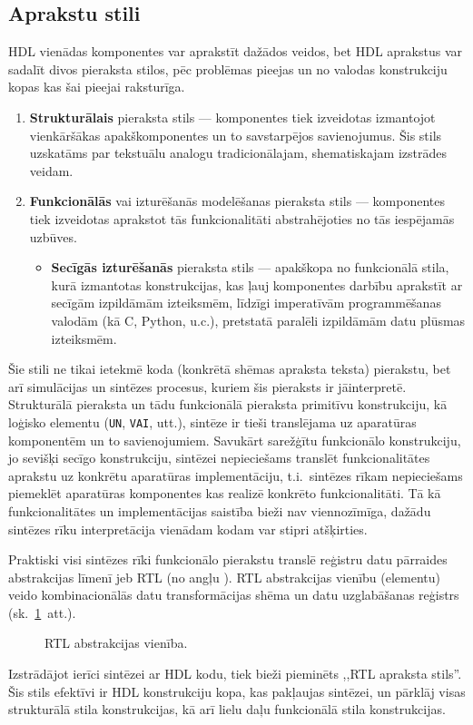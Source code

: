 \subsection{Aprakstu stili} \label{sec:hdl-styles}
HDL vienādas komponentes var aprakstīt dažādos veidos, bet
HDL aprakstus var sadalīt divos pieraksta stilos, pēc problēmas pieejas un
no valodas konstrukciju kopas kas šai pieejai raksturīga.
\begin{enumerate}
	\item \textbf{Strukturālais} pieraksta stils --- komponentes tiek
		izveidotas izmantojot vienkāršākas apakškomponentes un to savstarpējos
		savienojumus. Šis stils uzskatāms par tekstuālu analogu
		tradicionālajam, shematiskajam izstrādes veidam.
	\item \textbf{Funkcionālās} vai izturēšanās modelēšanas pieraksta
		stils --- komponentes tiek izveidotas aprakstot tās funkcionalitāti
		abstrahējoties no tās iespējamās uzbūves.
	\begin{itemize}
		\item \textbf{Secīgās izturēšanās} pieraksta stils --- apakškopa
			no funkcionālā stila, kurā izmantotas konstrukcijas, kas ļauj
			komponentes darbību aprakstīt ar secīgām izpildāmām izteiksmēm,
			līdzīgi imperatīvām programmēšanas valodām (kā C, Python, u.c.),
			pretstatā paralēli izpildāmām datu plūsmas izteiksmēm.
	\end{itemize}
\end{enumerate}
\pagebreak[3]

Šie stili ne tikai ietekmē koda (konkrētā shēmas apraksta teksta) pierakstu,
bet arī simulācijas un sintēzes procesus, kuriem šis pieraksts ir jāinterpretē.
Strukturālā pieraksta un tādu funkcionālā pieraksta primitīvu konstrukciju,
kā loģisko elementu (\texttt{UN}, \texttt{VAI}, utt.),
sintēze ir tieši translējama uz aparatūras komponentēm un to savienojumiem.
Savukārt sarežģītu funkcionālo konstrukciju, jo sevišķi secīgo
konstrukciju, sintēzei nepieciešams translēt funkcionalitātes aprakstu
uz konkrētu aparatūras implementāciju, t.i.~sintēzes rīkam nepieciešams
piemeklēt aparatūras komponentes kas realizē konkrēto funkcionalitāti.
Tā kā funkcionalitātes un implementācijas saistība bieži nav viennozīmīga,
dažādu sintēzes rīku interpretācija vienādam kodam var stipri atšķirties.

Praktiski visi sintēzes rīki funkcionālo pierakstu translē %
reģistru datu pārraides abstrakcijas līmenī jeb RTL
(no angļu ).\cite[2.~lpp.]{HDL}%
\cite[235.~lpp.]{Perry-VHDL}
RTL abstrakcijas vienību (elementu) veido kombinacionālās datu transformācijas shēma un
datu uzglabāšanas reģistrs (sk.~\ref{fig:rtl}~att.).
\begin{figure}[thb]
	\centering
	\def\svgscale{1.25}
	
	\caption[RTL abstrakcijas vienība.]{RTL abstrakcijas vienība.\cite[233.~lpp.]{Perry-VHDL}}
	\label{fig:rtl}
\end{figure}
Izstrādājot ierīci sintēzei ar HDL kodu, tiek bieži pieminēts
,,RTL apraksta stils''. Šis stils efektīvi ir HDL konstrukciju kopa, kas
pakļaujas sintēzei, un pārklāj visas strukturālā stila konstrukcijas, kā arī
lielu daļu funkcionālā stila konstrukcijas.

